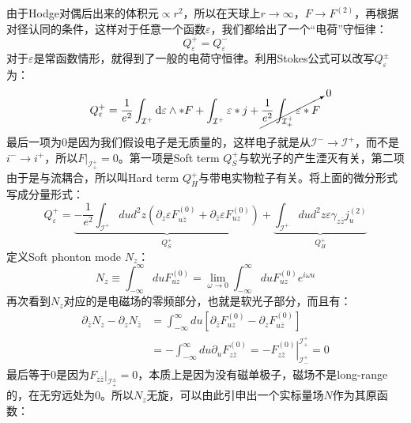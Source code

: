 由于Hodge对偶后出来的体积元$\propto r^2$，所以在天球上$r\to\infty$，$F\to F^{(2)}$，再根据对径认同的条件，这样对于任意一个函数$\varepsilon$，我们都给出了一个“电荷”守恒律：
\begin{equation}
	\boxed{
	Q_\varepsilon^+=Q_\varepsilon^-
	}
\end{equation}
对于$\varepsilon$是常函数情形，就得到了一般的电荷守恒律。利用Stokes公式可以改写$Q_\varepsilon^{\pm}$为：
\begin{equation}
	Q_\varepsilon^+=\frac{1}{e^2}\int_{\mathcal{I}^+}\mathrm{d}\varepsilon\wedge*F+\int_{\mathcal{I}^+}\varepsilon*j+\cancelto{0}{\frac{1}{e^2}\int_{\mathcal{I}_+^+}\varepsilon*F}
\end{equation}
最后一项为0是因为我们假设电子是无质量的，这样电子就是从$\mathcal{I}^-\to\mathcal{I}^+$，而不是$i^{-}\to i^+$，所以$F|_{\mathcal{I}_+^{+}}=0$。第一项是Soft term $Q_S^+$与软光子的产生湮灭有关，第二项由于是与流耦合，所以叫Hard term $Q_H^+$与带电实物粒子有关。将上面的微分形式写成分量形式：
\begin{equation}
	Q_{\varepsilon}^{+}=\underbrace{-\frac{1}{e^{2}}\int_{\mathcal{I}^{+}}dud^{2}z\left(\partial_{z}\varepsilon F_{u\bar{z}}^{(0)}+\partial_{\bar{z}}\varepsilon F_{uz}^{(0)}\right)}_{Q_{S}^{+}}+\underbrace{\int_{\mathcal{I}^{+}}dud^{2}z\varepsilon\gamma_{z\bar{z}}j_{u}^{(2)}}_{Q_{H}^{+}}
\end{equation}
定义Soft phonton mode $N_z$：
\begin{equation}\label{eq:23.18}
	N_{z}\equiv \int_{-\infty}^{\infty}duF_{uz}^{(0)}=\lim_{\omega\to0}\int_{-\infty}^{\infty}duF_{uz}^{(0)}e^{i\omega u}
\end{equation}
再次看到$N_z$对应的是电磁场的零频部分，也就是软光子部分，而且有：
\begin{equation}
	\begin{aligned}
		\partial_{\bar{z}}N_{z}-\partial_{z}N_{\bar{z}}& =\int_{-\infty}^{\infty}du\left[\partial_{\bar{z}}F_{uz}^{(0)}-\partial_{z}F_{u\bar{z}}^{(0)}\right]  \\
		&=-\int_{-\infty}^{\infty}du\left.\partial_{u}F_{z\bar{z}}^{(0)}=-F_{z\bar{z}}^{(0)}\right|_{\mathcal{I}_{-}^{+}}^{\mathcal{I}_{+}^{+}}=0
	\end{aligned}
\end{equation}
最后等于0是因为$F_{z\bar z}|_{\mathcal{I}_{+}^{\pm}}=0$，本质上是因为没有磁单极子，磁场不是long-range的，在无穷远处为0。所以$N_z$无旋，可以由此引申出一个实标量场$N$作为其原函数：
